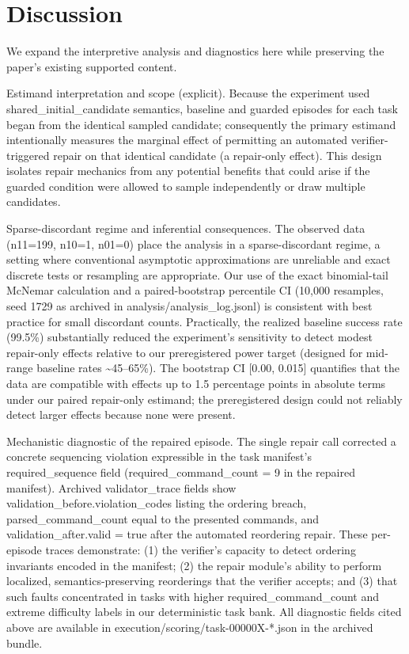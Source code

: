 \documentclass[conference]{IEEEtran}
\begin{document}
\section{Discussion}
We expand the interpretive analysis and diagnostics here while preserving the paper's existing supported content.

Estimand interpretation and scope (explicit). Because the experiment used shared\_initial\_candidate semantics, baseline and guarded episodes for each task began from the identical sampled candidate; consequently the primary estimand intentionally measures the marginal effect of permitting an automated verifier-triggered repair on that identical candidate (a repair-only effect). This design isolates repair mechanics from any potential benefits that could arise if the guarded condition were allowed to sample independently or draw multiple candidates.

Sparse-discordant regime and inferential consequences. The observed data (n11=199, n10=1, n01=0) place the analysis in a sparse-discordant regime, a setting where conventional asymptotic approximations are unreliable and exact discrete tests or resampling are appropriate. Our use of the exact binomial-tail McNemar calculation and a paired-bootstrap percentile CI (10,000 resamples, seed 1729 as archived in analysis/analysis\_log.jsonl) is consistent with best practice for small discordant counts. Practically, the realized baseline success rate (99.5\%) substantially reduced the experiment's sensitivity to detect modest repair-only effects relative to our preregistered power target (designed for mid-range baseline rates \textasciitilde{}45--65\%). The bootstrap CI [0.00, 0.015] quantifies that the data are compatible with effects up to 1.5 percentage points in absolute terms under our paired repair-only estimand; the preregistered design could not reliably detect larger effects because none were present.

Mechanistic diagnostic of the repaired episode. The single repair call corrected a concrete sequencing violation expressible in the task manifest's required\_sequence field (required\_command\_count = 9 in the repaired manifest). Archived validator\_trace fields show validation\_before.violation\_codes listing the ordering breach, parsed\_command\_count equal to the presented commands, and validation\_after.valid = true after the automated reordering repair. These per-episode traces demonstrate: (1) the verifier's capacity to detect ordering invariants encoded in the manifest; (2) the repair module's ability to perform localized, semantics-preserving reorderings that the verifier accepts; and (3) that such faults concentrated in tasks with higher required\_command\_count and extreme difficulty labels in our deterministic task bank. All diagnostic fields cited above are available in execution/scoring/task-00000X-*.json in the archived bundle.
\end{document}
